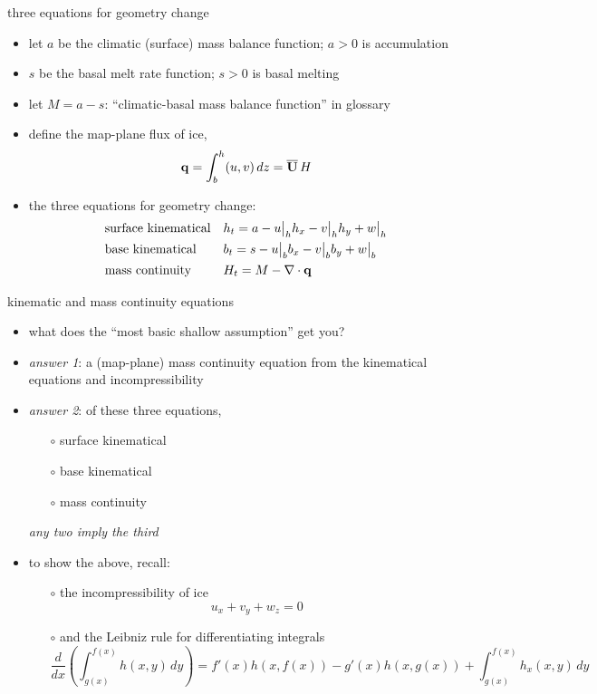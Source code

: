 \begin{frame}{three equations for geometry change}

\begin{itemize}
\item let $a$ be the climatic (surface) mass balance function;  $a>0$ is accumulation
\item $s$ be the basal melt rate function;  $s>0$ is basal melting
\item let $M=a-s$: ``climatic-basal mass balance function'' in glossary
\item define the map-plane flux of ice,
	$$\mathbf{q} = \int_{b}^{h} (u,v)\,dz = \overline{\mathbf{U}}\,H$$
\item the three equations for geometry change:
\begin{align*}
&\text{surface kinematical} && h_t = a - u\big|_h h_x - v\big|_h h_y + w\big|_h  \\
&\text{base kinematical} && b_t = s - u\big|_b b_x - v\big|_b b_y + w\big|_b  \\
&\text{mass continuity} && H_t = M - \nabla\cdot \mathbf{q} \\
\end{align*}
\end{itemize}
\end{frame}


\begin{frame}{kinematic and mass continuity equations}

\begin{itemize}
\item what does the ``most basic shallow assumption'' get you?
\item \emph{answer 1}: a (map-plane) mass continuity equation from the kinematical equations and incompressibility
\item \emph{answer 2}: of these three equations,
  \begin{itemize}
  \item[$\circ$]  surface kinematical
  \item[$\circ$]  base kinematical
  \item[$\circ$]  mass continuity
  \end{itemize}
\emph{any two imply the third}

\bigskip
\item to show the above, recall:
  \begin{itemize}
  \item[$\circ$]  the incompressibility of ice
    $$u_x + v_y + w_z = 0$$
  \item[$\circ$]  and the Leibniz rule for differentiating integrals
  \scriptsize
    $$\frac{d}{dx}\left(\int_{g(x)}^{f(x)} h(x,y)\,dy\right) = f'(x) h(x,f(x)) - g'(x) h(x,g(x)) + \int_{g(x)}^{f(x)} h_x(x,y)\,dy$$
  \end{itemize}
\end{itemize}
\end{frame}


